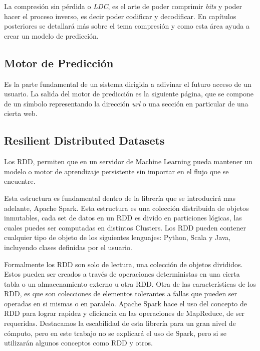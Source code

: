 La compresión sin pérdida o \emph{LDC}, es el arte de poder comprimir \emph{bits} y poder hacer el proceso inverso, es decir poder codificar y decodificar. En capítulos posteriores se detallará más sobre el tema compresión y como esta área ayuda a crear un modelo de predicción.





\subsection{Motor de Predicción}

Es la parte fundamental de un sistema dirigida a adivinar el futuro acceso de un usuario. La salida del motor de predicción es la siguiente página, que se compone de un símbolo representando la dirección \emph{url} o una sección en particular de una cierta web. 

 


\subsection{Resilient Distributed Datasets }

	Los RDD, permiten que en un servidor de Machine Learning pueda mantener un modelo o motor de aprendizaje persistente sin importar en el flujo que se encuentre.

	Esta estructura es fundamental dentro de la librería que se introducirá mas adelante, Apache Spark. Esta estructura es una colección distribuida de objetos inmutables, cada 
	set de datos en un RDD es divido en particiones lógicas, las cuales puedes ser computadas en distintos Clusters. Los RDD pueden contener cualquier tipo de objeto de los siguientes lenguajes: Python, Scala y Java, incluyendo clases definidas por el usuario. 

	Formalmente los RDD son solo de lectura, una colección de objetos divididos. Estos pueden ser creados a través de  operaciones deterministas en una cierta tabla o un almacenamiento externo u otra RDD.
	Otra de las características de los RDD, es que son colecciones de elementos tolerantes a fallas que pueden ser operadas en si mismas o en paralelo.
	Apache Spark hace el uso del concepto de RDD para lograr rapidez y eficiencia en las operaciones de MapReduce, de ser requeridas. Destacamos la escabilidad de esta librería para un gran nivel de cómputo, pero en este trabajo no se explicará el uso de Spark, pero si se utilizarán algunos conceptos como RDD y otros.




